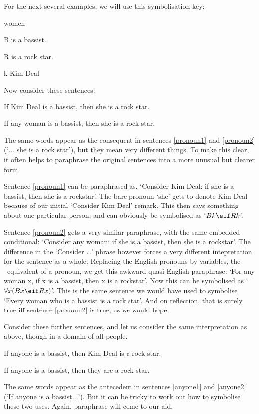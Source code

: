 For the next several examples, we will use this symbolisation key:
	\begin{ekey}
		\item[\text{domain}] women
		\item[B]  is a bassist.
		\item[R]  is a rock star.
		\item[k] Kim Deal
	\end{ekey}
Now consider these sentences:
	\begin{earg}
		\item[\ex{pronoun1}] If Kim Deal is a bassist, then she is a rock star.
		\item[\ex{pronoun2}] If any woman is a bassist, then she is a rock star.
	\end{earg}
The same words appear as the consequent in sentences \ref{pronoun1} and \ref{pronoun2} (`$…$ she is a rock star'), but they mean very different things. To make this clear, it often helps to paraphrase the original sentences into a more unusual but clearer form.

Sentence \ref{pronoun1} can be paraphrased as, `Consider Kim Deal: if she is a bassist, then she is a rockstar'. The bare pronoun `she' gets to denote Kim Deal because of our initial `Consider Kim Deal' remark. This then says something about one particular person, and can obviously be symbolised as `$Bk \eif Rk$'.

Sentence \ref{pronoun2} gets a very similar paraphrase, with the same embedded conditional: `Consider any woman: if she is a bassist, then she is a rockstar'. The difference in the `Consider …' phrase however forces a very different intepretation for the sentence as a whole. Replacing the English pronouns by variables, the \FOL\ equivalent of a pronoun, we get this awkward quasi-English paraphrase: `For any woman x, if x is a bassist, then x is a rockstar'. Now this can be symbolised as `$\forall x (Bx \eif Rx)$'. This is the same sentence we would have used to symbolise `Every woman who is a bassist is a rock star'. And on reflection, that is surely true iff sentence \ref{pronoun2} is true, as we would hope.

Consider these further sentences, and let us consider the same interpretation as above, though in a domain of all people.
	\begin{earg}
		\item[\ex{anyone1}] If anyone is a bassist, then Kim Deal is a rock star.
		\item[\ex{anyone2}] If anyone is a bassist, then they are a rock star.
	\end{earg}
The same words appear as the antecedent in sentences \ref{anyone1} and \ref{anyone2}  (`If anyone is a bassist$…$'). But it can be tricky to work out how to symbolise these two uses. Again, paraphrase will come to our aid. 

